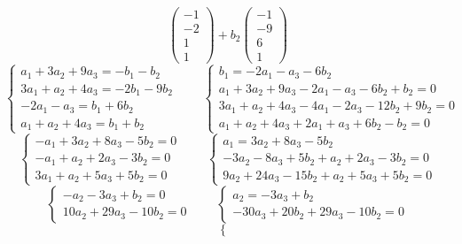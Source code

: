 \begin{enumerate}
$$    \begin{pmatrix}
    	-1 \\
        -2 \\
        1 \\
        1
    \end{pmatrix} + b_2
    \begin{pmatrix}
    	-1 \\
        -9 \\
        6 \\
        1
    \end{pmatrix} $$
    $$
    \begin{cases}
    	a_1 + 3a_2 + 9a_3 = -b_1 - b_2 \\
        3a_1 + a_2 + 4a_3 = -2b_1 - 9b_2 \\
        -2a_1 - a_3 = b_1 + 6b_2 \\
        a_1 + a_2 + 4a_3 = b_1 + b_2
    \end{cases} \qquad
    \begin{cases}
    	b_1 = -2a_1 - a_3 - 6b_2 \\
        a_1 + 3a_2 + 9a_3 - 2a_1 - a_3 - 6b_2 + b_2 = 0 \\
        3a_1 + a_2 + 4a_3 - 4a_1 - 2a_3 - 12b_2 + 9b_2 = 0 \\
        a_1 + a_2 + 4a_3 + 2a_1 + a_3 + 6b_2 - b_2 = 0
    \end{cases} $$
    $$
    \begin{cases}
    	-a_1 + 3a_2 + 8a_3 - 5b_2 = 0 \\
        -a_1 + a_2 + 2a_3 - 3b_2 = 0 \\
        3a_1 + a_2 + 5a_3 + 5b_2 = 0
    \end{cases} \qquad
    \begin{cases}
    	a_1 = 3a_2 + 8a_3 - 5b_2 \\
        -3a_2 - 8a_3 + 5b_2 + a_2 + 2a_3 - 3b_2 = 0 \\
        9a_2 + 24a_3 - 15b_2 + a_2 + 5a_3 + 5b_2 = 0
    \end{cases} $$
    $$
    \begin{cases}
    	-a_2 - 3a_3 + b_2 = 0 \\
        10a_2 + 29a_3 - 10b_2 = 0
    \end{cases} \qquad
    \begin{cases}
    	a_2 = -3a_3 + b_2 \\
        -30a_3 + 20b_2 + 29a_3 - 10b_2 = 0
    \end{cases} $$
    $$
    \begin{cases}

\end{cases}$$
\end{enumerate}
